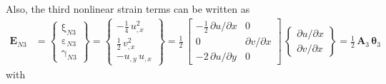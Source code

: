 Also, the third nonlinear strain terms can be written as
\begin{equation}
	\begin{aligned}
		\mathbf{E}_{N3} & =  \begin{Bmatrix}
			\mathrm \xi_{N3} \\
			\mathrm \varepsilon_{N3} \\
			\mathrm \gamma_{N3} \end{Bmatrix} =
		\begin{Bmatrix}
			-\tfrac{1}{4} \, u_{,x}^2  \\
			\tfrac{1}{2} \, v_{,x}^2  \\
			-u_{,y} \, u_{,x}  \end{Bmatrix}  = \frac{1}{2} \, \begin{bmatrix}
			-\tfrac{1}{2} \, \partial u / \partial x & 0  \\
			0 & \partial v / \partial x \\
			-2 \, \partial u / \partial y  & 0  \end{bmatrix} \, \begin{Bmatrix}
			\partial u / \partial x\\
			\partial v / \partial x
		\end{Bmatrix} = \tfrac{1}{2} \, \mathbf{A}_3 \, \boldsymbol{\theta}_3
	\end{aligned}
\end{equation}
with 
